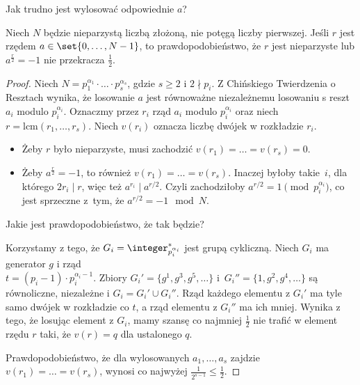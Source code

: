 Jak trudno jest wylosować odpowiednie \( a \)?
\begin{theorem}
    Niech \( N \) będzie nieparzystą liczbą złożoną, nie potęgą liczby pierwszej. Jeśli \( r \) jest rzędem \( a \in \set{0, \ldots, N-1} \), to prawdopodobieństwo,
    że \( r \) jest nieparzyste lub \( a^{\frac{r}{2}} = -1 \) nie przekracza \( \frac{1}{2} \).
\end{theorem}
\begin{proof}
    Niech \( N = p_1^{\alpha_1} \cdot \ldots \cdot p_s^{\alpha_s} \), gdzie \(s \geq 2\) i \( 2 \nmid p_i \).
    Z Chińskiego Twierdzenia o Resztach wynika, że losowanie \(a\) jest równoważne niezależnemu losowaniu s reszt \(a_i\) modulo \(p_i^{\alpha_i}\).
    Oznaczmy przez \(r_i\) rząd \(a_i\) modulo \(p_i^{\alpha_i}\) oraz niech \(r = \text{lcm}(r_1, \ldots, r_s)\). Niech \(v(r_i)\) oznacza liczbę dwójek w rozkładzie \(r_i\).

    \begin{itemize}
        \item Żeby \( r \) było nieparzyste, musi zachodzić \( v(r_1) = \ldots = v(r_s) = 0 \).
        \item Żeby \( a^{\frac{r}{2}} = -1 \), to również \( v(r_1) = \ldots = v(r_s) \). Inaczej byłoby takie~\( i \), dla którego \(2r_i \mid r\), więc też \(a^{r_i} \mid a^{r/2}\).
        Czyli zachodziłoby \(a^{r/2} = 1 \pmod{p_i^{\alpha_i}}\), co jest sprzeczne z~tym, że \(a^{r/2} = -1 \mod N\).
    \end{itemize}
    
\newpage
    Jakie jest prawdopodobieństwo, że tak będzie?
    
    Korzystamy z tego, że \(G_i = \integer_{p_i^{\alpha_i}}^*\) jest grupą cykliczną. Niech \( G_i \) ma generator \(g\) i rząd \\ \( t = (p_i - 1) \cdot p_i^{\alpha_i-1} \). Zbiory \(G_i' = \{g^1, g^3, g^5, \ldots\}\) i~\(G_i'' = \{1, g^2, g^4, \ldots\}\) są równoliczne, niezależne i \(G_i = G_i' \cup G_i''\).
    Rząd każdego elementu z \(G_i'\) ma tyle samo dwójek w rozkładzie co \(t\), a rząd elementu z \(G_i''\) ma ich mniej. Wynika z tego, że losując element z \(G_i\), mamy szansę co najmniej \(\frac{1}{2}\) nie trafić w element rzędu \( r \) taki, że \(v(r) = q\) dla ustalonego \(q\).
    
    Prawdopodobieństwo, że dla wylosowanych \(a_1, \ldots, a_s\) zajdzie \(v(r_1) = \ldots = v(r_s)\), wynosi co najwyżej \(\frac{1}{2^{s-1}} \leq \frac{1}{2}\).
\end{proof}
